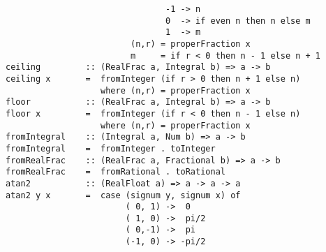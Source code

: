 \mbox{\tt \ \ \ \ \ \ \ \ \ \ \ \ \ \ \ \ \ \ \ \ \ \ \ \ \ \ \ \ \ \ \ \ -1\ ->\ n}\\
\mbox{\tt \ \ \ \ \ \ \ \ \ \ \ \ \ \ \ \ \ \ \ \ \ \ \ \ \ \ \ \ \ \ \ \ 0\ \ ->\ if\ even\ n\ then\ n\ else\ m}\\
\mbox{\tt \ \ \ \ \ \ \ \ \ \ \ \ \ \ \ \ \ \ \ \ \ \ \ \ \ \ \ \ \ \ \ \ 1\ \ ->\ m}\\
\mbox{\tt \ \ \ \ \ \ \ \ \ \ \ \ \ \ \ \ \ \ \ \ \ \ \ \ \ (n,r)\ =\ properFraction\ x}\\
\mbox{\tt \ \ \ \ \ \ \ \ \ \ \ \ \ \ \ \ \ \ \ \ \ \ \ \ \ m\ \ \ \ \ =\ if\ r\ <\ 0\ then\ n\ -\ 1\ else\ n\ +\ 1}
%
\eprogB\noindent\bprogB
\mbox{\tt ceiling\ \ \ \ \ \ \ \ \ ::\ (RealFrac\ a,\ Integral\ b)\ =>\ a\ ->\ b}\\
\mbox{\tt ceiling\ x\ \ \ \ \ \ \ =\ \ fromInteger\ (if\ r\ >\ 0\ then\ n\ +\ 1\ else\ n)}\\
\mbox{\tt \ \ \ \ \ \ \ \ \ \ \ \ \ \ \ \ \ \ \ where\ (n,r)\ =\ properFraction\ x}
%
\eprogB\noindent\bprogB
\mbox{\tt floor\ \ \ \ \ \ \ \ \ \ \ ::\ (RealFrac\ a,\ Integral\ b)\ =>\ a\ ->\ b}\\
\mbox{\tt floor\ x\ \ \ \ \ \ \ \ \ =\ \ fromInteger\ (if\ r\ <\ 0\ then\ n\ -\ 1\ else\ n)}\\
\mbox{\tt \ \ \ \ \ \ \ \ \ \ \ \ \ \ \ \ \ \ \ where\ (n,r)\ =\ properFraction\ x}
%
\eprogB\noindent\bprogB
\mbox{\tt fromIntegral\ \ \ \ ::\ (Integral\ a,\ Num\ b)\ =>\ a\ ->\ b}\\
\mbox{\tt fromIntegral\ \ \ \ =\ \ fromInteger\ .\ toInteger}
%
\eprogB\noindent\bprogB
\mbox{\tt fromRealFrac\ \ \ \ ::\ (RealFrac\ a,\ Fractional\ b)\ =>\ a\ ->\ b}\\
\mbox{\tt fromRealFrac\ \ \ \ =\ \ fromRational\ .\ toRational}
%
\eprogB\noindent\bprogB
\mbox{\tt atan2\ \ \ \ \ \ \ \ \ \ \ ::\ (RealFloat\ a)\ =>\ a\ ->\ a\ ->\ a}\\
\mbox{\tt atan2\ y\ x\ \ \ \ \ \ \ =\ \ case\ (signum\ y,\ signum\ x)\ of}\\
\mbox{\tt \ \ \ \ \ \ \ \ \ \ \ \ \ \ \ \ \ \ \ \ \ \ \ \ (\ 0,\ 1)\ ->\ \ 0}\\
\mbox{\tt \ \ \ \ \ \ \ \ \ \ \ \ \ \ \ \ \ \ \ \ \ \ \ \ (\ 1,\ 0)\ ->\ \ pi/2}\\
\mbox{\tt \ \ \ \ \ \ \ \ \ \ \ \ \ \ \ \ \ \ \ \ \ \ \ \ (\ 0,-1)\ ->\ \ pi}\\
\mbox{\tt \ \ \ \ \ \ \ \ \ \ \ \ \ \ \ \ \ \ \ \ \ \ \ \ (-1,\ 0)\ ->\ -pi/2}\\

